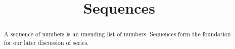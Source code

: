 \documentclass{ximera}
\title{Sequences}
\begin{document}
\begin{abstract}
  A sequence of numbers is an unending list of numbers.  Sequences form the foundation for our later discussion of series.
\end{abstract}

\maketitle



\end{document}
